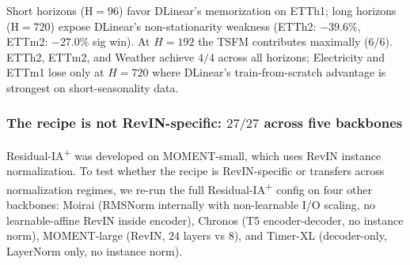 \documentclass{article}
\begin{document}
Short horizons (H${=}96$) favor DLinear's memorization on ETTh1; long horizons (H${=}720$) expose DLinear's non-stationarity weakness (ETTh2: $-39.6\%$, ETTm2: $-27.0\%$ sig win). At $H{=}192$ the TSFM contributes maximally ($6/6$). ETTh2, ETTm2, and Weather achieve $4/4$ across all horizons; Electricity and ETTm1 lose only at $H{=}720$ where DLinear's train-from-scratch advantage is strongest on short-seasonality data.

\subsubsection*{The recipe is not RevIN-specific: $27/27$ across five backbones}

Residual-IA\textsuperscript{+} was developed on MOMENT-small, which uses RevIN instance normalization. To test whether the recipe is RevIN-specific or transfers across normalization regimes, we re-run the full Residual-IA\textsuperscript{+} config on four other backbones: Moirai (RMSNorm internally with non-learnable I/O scaling, no learnable-affine RevIN inside encoder), Chronos (T5 encoder-decoder, no instance norm), MOMENT-large (RevIN, $24$ layers vs $8$), and Timer-XL (decoder-only, LayerNorm only, no instance norm).

\begin{table}[!htbp]
\centering
\caption{\textbf{Cross-backbone Residual-IA\textsuperscript{+} at H${=}96$} (strictly frozen, Top-2, $n{=}5$ seeds, Welch $t$-test). All five backbones achieve significant wins on all six datasets ($27/27$). Moirai-MoE confirms adapter-level MoE stacks with backbone-internal MoE.}
\label{tab:residual_ia_plus_backbone}
\small
{}
\end{table}
\end{document}
